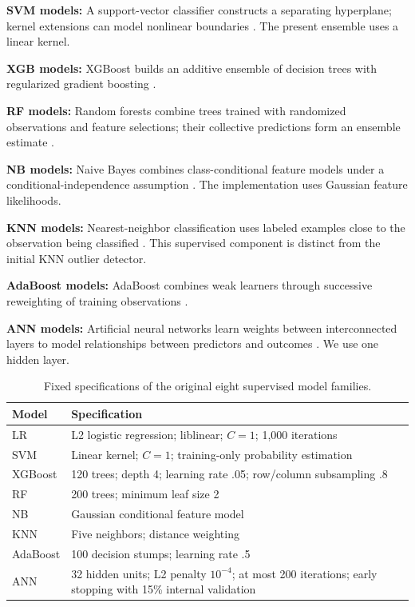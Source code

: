 \textbf{SVM models:} A support-vector classifier constructs a separating
hyperplane; kernel extensions can model nonlinear boundaries
\citep{Cortes1995}. The present ensemble uses a linear kernel.

\textbf{XGB models:} XGBoost builds an additive ensemble of decision trees
with regularized gradient boosting \citep{Chen2016}.

\textbf{RF models:} Random forests combine trees trained with randomized
observations and feature selections; their collective predictions form an
ensemble estimate \citep{Breiman2001}.

\textbf{NB models:} Naive Bayes combines class-conditional feature models
under a conditional-independence assumption \citep{Domingos1997}. The
implementation uses Gaussian feature likelihoods.

\textbf{KNN models:} Nearest-neighbor classification uses labeled examples
close to the observation being classified \citep{Cover1967}. This supervised
component is distinct from the initial KNN outlier detector.

\textbf{AdaBoost models:} AdaBoost combines weak learners through
successive reweighting of training observations \citep{Freund1997}.

\textbf{ANN models:} Artificial neural networks learn weights between
interconnected layers to model relationships between predictors and
outcomes \citep{Rumelhart1986}. We use one hidden layer.

\begin{revised}
\begin{table}[tbp]\centering\small
\caption{Fixed specifications of the original eight supervised model families.}
\label{tab:learners}
\begin{tabularx}{\linewidth}{p{2.0cm}X}\toprule
Model & Specification\\\midrule
LR & L2 logistic regression; liblinear; $C=1$; 1,000 iterations\\
SVM & Linear kernel; $C=1$; training-only probability estimation\\
XGBoost & 120 trees; depth 4; learning rate .05; row/column subsampling .8\\
RF & 200 trees; minimum leaf size 2\\
NB & Gaussian conditional feature model\\
KNN & Five neighbors; distance weighting\\
AdaBoost & 100 decision stumps; learning rate .5\\
ANN & 32 hidden units; L2 penalty $10^{-4}$; at most 200 iterations;
early stopping with 15\% internal validation\\
\bottomrule\end{tabularx}\end{table}
\end{revised}

